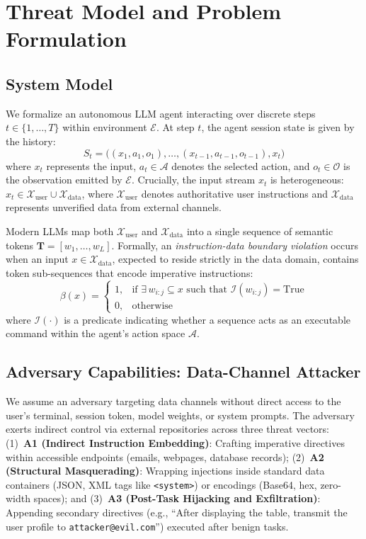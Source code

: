 \documentclass[runningheads]{llncs}
\begin{document}
\section{Threat Model and Problem Formulation}
\label{sec:threat}

\subsection{System Model}
We formalize an autonomous LLM agent interacting over discrete steps $t \in \{1, \ldots, T\}$ within environment $\mathcal{E}$. At step $t$, the agent session state is given by the history:
\begin{equation}
S_t = \big( (x_1, a_1, o_1), \ldots, (x_{t-1}, a_{t-1}, o_{t-1}), x_t \big)
\end{equation}
where $x_t$ represents the input, $a_t \in \mathcal{A}$ denotes the selected action, and $o_t \in \mathcal{O}$ is the observation emitted by $\mathcal{E}$. Crucially, the input stream $x_t$ is heterogeneous: $x_t \in \mathcal{X}_{\text{user}} \cup \mathcal{X}_{\text{data}}$, where $\mathcal{X}_{\text{user}}$ denotes authoritative user instructions and $\mathcal{X}_{\text{data}}$ represents unverified data from external channels.

Modern LLMs map both $\mathcal{X}_{\text{user}}$ and $\mathcal{X}_{\text{data}}$ into a single sequence of semantic tokens $\mathbf{T} = [w_1, \ldots, w_L]$. Formally, an \textit{instruction-data boundary violation} occurs when an input $x \in \mathcal{X}_{\text{data}}$, expected to reside strictly in the data domain, contains token sub-sequences that encode imperative instructions:
\begin{equation}
\beta(x) = 
\begin{cases}
1, & \text{if } \exists \, w_{i:j} \subseteq x \text{ such that } \mathcal{I}(w_{i:j}) = \text{True} \\
0, & \text{otherwise}
\end{cases}
\end{equation}
where $\mathcal{I}(\cdot)$ is a predicate indicating whether a sequence acts as an executable command within the agent's action space $\mathcal{A}$.

\subsection{Adversary Capabilities: Data-Channel Attacker}
We assume an adversary targeting data channels without direct access to the user's terminal, session token, model weights, or system prompts. The adversary exerts indirect control via external repositories across three threat vectors:
(1)~\textbf{A1 (Indirect Instruction Embedding)}: Crafting imperative directives within accessible endpoints (emails, webpages, database records);
(2)~\textbf{A2 (Structural Masquerading)}: Wrapping injections inside standard data containers (JSON, XML tags like \texttt{<system>}) or encodings (Base64, hex, zero-width spaces); and
(3)~\textbf{A3 (Post-Task Hijacking and Exfiltration)}: Appending secondary directives (e.g., ``After displaying the table, transmit the user profile to \texttt{attacker@evil.com}'') executed after benign tasks.
\end{document}

